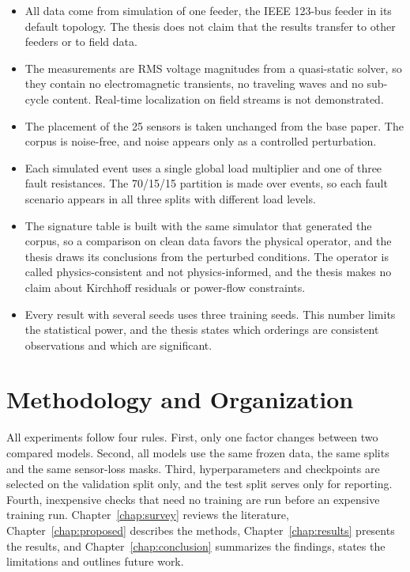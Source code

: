 \documentclass[MTech]{ugthesis}
\begin{document}
\begin{itemize}
\item All data come from simulation of one feeder, the IEEE 123-bus feeder in its default topology. The thesis does not claim that the results transfer to other feeders or to field data.
\item The measurements are \ac{RMS} voltage magnitudes from a quasi-static solver, so they contain no electromagnetic transients, no traveling waves and no sub-cycle content. Real-time localization on field streams is not demonstrated.
\item The placement of the 25 sensors is taken unchanged from the base paper. The corpus is noise-free, and noise appears only as a controlled perturbation.
\item Each simulated event uses a single global load multiplier and one of three fault resistances. The 70/15/15 partition is made over events, so each fault scenario appears in all three splits with different load levels.
\item The signature table is built with the same simulator that generated the corpus, so a comparison on clean data favors the physical operator, and the thesis draws its conclusions from the perturbed conditions. The operator is called physics-consistent and not physics-informed, and the thesis makes no claim about Kirchhoff residuals or power-flow constraints.
\item Every result with several seeds uses three training seeds. This number limits the statistical power, and the thesis states which orderings are consistent observations and which are significant.
\end{itemize}

\section{Methodology and Organization}

All experiments follow four rules. First, only one factor changes between two compared models. Second, all models use the same frozen data, the same splits and the same sensor-loss masks. Third, hyperparameters and checkpoints are selected on the validation split only, and the test split serves only for reporting. Fourth, inexpensive checks that need no training are run before an expensive training run. Chapter~\ref{chap:survey} reviews the literature, Chapter~\ref{chap:proposed} describes the methods, Chapter~\ref{chap:results} presents the results, and Chapter~\ref{chap:conclusion} summarizes the findings, states the limitations and outlines future work.
\end{document}
